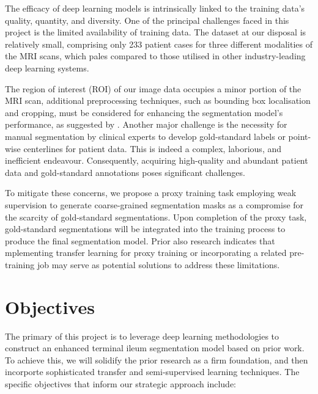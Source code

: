 The efficacy of deep learning models is intrinsically linked to the training data's quality, quantity, and diversity. One of the principal challenges faced in this project is the limited availability of training data. The dataset at our disposal is relatively small, comprising only 233 patient cases for three different modalities of the MRI scans, which pales compared to those utilised in other industry-leading deep learning systems. 

The region of interest (ROI) of our image data occupies a minor portion of the MRI scan, additional preprocessing techniques, such as bounding box localisation and cropping, must be considered for enhancing the segmentation model's performance, as suggested by \cite{Ali2022}. Another major challenge is the necessity for manual segmentation by clinical experts to develop gold-standard labels or point-wise centerlines for patient data. This is indeed a complex, laborious, and inefficient endeavour. Consequently, acquiring high-quality and abundant patient data and gold-standard annotations poses significant challenges.

To mitigate these concerns, we propose a proxy training task employing weak supervision to generate coarse-grained segmentation masks as a compromise for the scarcity of gold-standard segmentations. Upon completion of the proxy task, gold-standard segmentations will be integrated into the training process to produce the final segmentation model. Prior also research \cite{Ali2022} indicates that mplementing transfer learning for proxy training \cite{jang2021effectiveness} or incorporating a related pre-training job may serve as potential solutions to address these limitations.

\section{Objectives}

The primary of this project is to leverage deep learning methodologies to construct an enhanced terminal ileum segmentation model based on prior work. To achieve this, we will solidify the prior research as a firm foundation, and then incorporte sophisticated transfer and semi-supervised learning techniques. The specific objectives that inform our strategic approach include:

